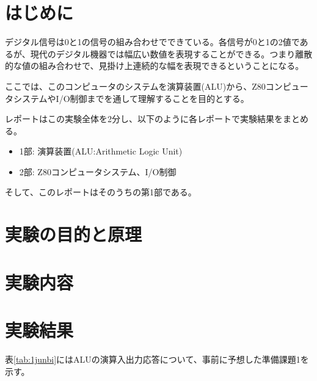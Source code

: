 \documentclass[11pt,a4j]{jsarticle}
\title{}
\author{1413176 三村幸祐}
\date{2016/12/14}
\begin{document}
  
  
  
  
 \section{はじめに}
  デジタル信号は0と1の信号の組み合わせでできている。各信号が0と1の2値であるが、現代のデジタル機器では幅広い数値を表現することができる。つまり離散的な値の組み合わせで、見掛け上連続的な幅を表現できるということになる。
  
  ここでは、このコンピュータのシステムを演算装置(ALU)から、Z80コンピュータシステムやI/O制御までを通して理解することを目的とする。
  
  レポートはこの実験全体を2分し、以下のように各レポートで実験結果をまとめる。
  \begin{itemize}
  \item 1部: 演算装置(ALU:Arithmetic Logic Unit)
  \item 2部: Z80コンピュータシステム、I/O制御
  \end{itemize}
  
  そして、このレポートはそのうちの第1部である。
  
 \section{実験の目的と原理}
  
  
  
 \section{実験内容}
  
  
  
 \section{実験結果}
  
  表\ref{tab:1junbi}にはALUの演算入出力応答について、事前に予想した準備課題1を示す。
  
\end{document}
